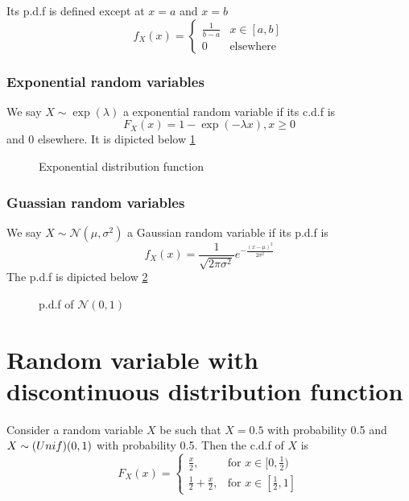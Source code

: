 Its p.d.f is defined except at $x=a$ and $x=b$
$$f_X(x) = \begin{cases}
	\frac{1}{b-a} &  x \in [a,b] \\
	0 & \textrm{elsewhere}
\end{cases} $$

\subsubsection{Exponential random variables}
We say $X\sim \exp(\lambda)$ a exponential random variable if its c.d.f is
$$F_X(x) = 1 - \exp(-\lambda x), x\geq 0$$
and 0 elsewhere. It is dipicted below \ref{fig:exponential}

\begin{figure}[h]\centering
	\label{fig:exponential}
	\caption{Exponential distribution function}
\end{figure}


\subsubsection{Guassian random variables}
We say $X\sim \mathcal{N}(\mu, \sigma^2)$ a Gaussian random variable if its p.d.f is
$$f_X(x) = \frac{1}{\sqrt{2\pi \sigma^2}} e^{-\frac{(x-\mu)^2}{2\sigma^2}}$$
The p.d.f is dipicted below \ref{fig:norm}
\begin{figure}[h]\centering
	\label{fig:norm}
	\caption{p.d.f of $\mathcal{N}(0,1)$}
\end{figure}

\section{Random variable with discontinuous distribution function}
Consider a random variable $X$ be such that $X=0.5$ with probability 0.5 and $X\sim \textrm(Unif)(0,1)$ with probability 0.5. Then the c.d.f of $X$ is
$$F_X(x) =  \begin{cases}
	\frac{x}{2}, & \textrm{for $x\in [0, \frac{1}{2})$} \\
	\frac{1}{2} + \frac{x}{2}, & \textrm{for $x\in [\frac{1}{2}, 1]$}
	\end{cases}
$$


